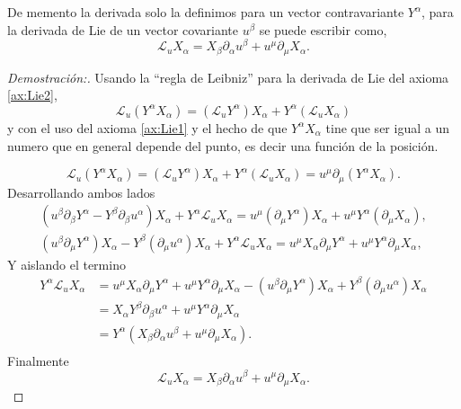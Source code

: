 \noindent De memento la derivada solo la definimos para un vector contravariante $Y^\alpha$, para la derivada de Lie de un vector covariante $u^\beta$ se puede escribir como,
\begin{equation}
    \mathscr{L}_u X_\alpha=X_\beta \partial_\alpha u^\beta+u^\mu \partial_\mu X_\alpha .
\end{equation}
\begin{proof}[Demostración:]
    Usando la  ``regla de Leibniz'' para la derivada de Lie del axioma \ref{ax:Lie2},
    \begin{equation}
        \mathscr{L}_u\left(Y^\alpha X_\alpha\right)=\left(\mathscr{L}_u Y^\alpha\right) X_{\alpha} + Y^\alpha \left(\mathscr{L}_u X_\alpha\right)
    \end{equation}
    y con el uso del axioma \ref{ax:Lie1} y el hecho de que $Y^\alpha X_\alpha$ tine que ser igual a un numero que en general depende del punto, es decir una función de la posición.

    \begin{equation}
        \mathscr{L}_u\left(Y^\alpha X_\alpha\right)=\left(\mathscr{L}_u Y^\alpha\right) X_\alpha+Y^\alpha\left(\mathscr{L}_u X_\alpha\right)=u^\mu \partial_\mu\left(Y^\alpha X_\alpha\right).
    \end{equation}
    Desarrollando ambos lados
    \begin{align*}
        \left(u^\beta \partial_\beta Y^\alpha-Y^\beta \partial_\beta u^\alpha\right) X_\alpha+Y^\alpha \mathscr{L}_u X_\alpha=u^\mu\left(\partial_\mu Y^\alpha\right) X_\alpha+u^\mu Y^\alpha (\partial_\mu X_\alpha ), \\
        \left(u^\beta \partial_\mu Y^\alpha\right) X_\alpha-Y^\beta\left(\partial_\mu u^\alpha\right) X_\alpha+Y^\alpha \mathscr{L}_u X_\alpha=u^\mu X_\alpha \partial_\mu Y^\alpha+u^\mu Y^\alpha \partial_\mu X_\alpha,
    \end{align*}
    Y aislando el termino
    \begin{align*}
        Y^\alpha \mathscr{L}_u X_\alpha & =  u^\mu X_\alpha \partial_\mu Y^\alpha+u^\mu Y^\alpha \partial_\mu X_\alpha  - \left(u^\beta \partial_\mu Y^\alpha\right) X_\alpha + Y^\beta\left(\partial_\mu u^\alpha\right) X_\alpha \\
                                        & = X_\alpha Y^\beta \partial_\beta u^\alpha+u^\mu Y^\alpha \partial_\mu X_\alpha                                                                                                          \\
                                        & = Y^\alpha\left(X_\beta \partial_\alpha u^\beta+u^\mu \partial_\mu X_\alpha\right).                                                                                                      \\
    \end{align*}
    Finalmente
    \begin{equation}
        \mathscr{L}_u X_\alpha  = X_\beta \partial_\alpha u^\beta+u^\mu \partial_\mu X_\alpha.
    \end{equation}
\end{proof}



